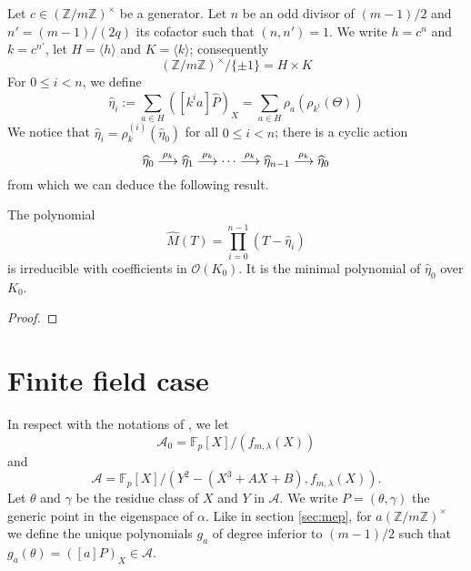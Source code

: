 \documentclass[a4paper]{article} %
\newcommand\zmodninv[1]{(\mathbb{Z}/#1\mathbb{Z})^{\times}}
\newcommand\GF[1]{\mathbb{F}_{#1}}
\newcommand\EO{\mathcal{O}}
\newcommand\groupgen[1]{\langle{#1}\rangle}
\begin{document}
Let $c\in\zmodninv{m}$ be a generator. Let $n$ be an odd divisor of $(m-1)/2$
and $n' = (m-1)/(2q)$ its cofactor such that $(n, n') = 1$.
We write $h = c^n$ and $k = c^{n'}$, let $H = \groupgen{h}$ and $K =
\groupgen{k}$; consequently 
\begin{equation}
\zmodninv{m}/\lbrace{\pm1}\rbrace = H \times K
\end{equation}
For $0 \leq i < n$, we define 
\begin{equation}
\widehat{\eta}_i := \sum_{a\in H}{\left([k^ia]\widehat{P}\right)_X} = \sum_{a\in
H}{\rho_a(\rho_{k^i}(\Theta))}
\end{equation}
We notice that $\widehat{\eta}_i = \rho_k^{(i)}(\widehat{\eta}_0)$ for all $ 0 \leq
i < n$; there is a cyclic action
\begin{equation}
\widehat{\eta}_0 \buildrel\rho_k\over\longrightarrow
\widehat{\eta}_1 \buildrel\rho_k\over\longrightarrow \dots 
\buildrel\rho_k\over\longrightarrow \widehat{\eta}_{n-1}
\buildrel\rho_k\over\longrightarrow \widehat{\eta}_0
\end{equation}
from which we can deduce the following result.
\begin{lem}
The polynomial
\begin{equation}
\widehat{M}(T) = \prod_{i = 0}^{n - 1}{(T - \widehat{\eta}_i)}
\end{equation}
is irreducible with coefficients in $\EO(K_0)$. It is the minimal
polynomial of $\widehat{\eta}_0$ over $K_0$.
\end{lem}
\begin{proof}


\end{proof}

\section{Finite field case}

In respect with the notations of \cite{MiMoSch}, we let
\begin{equation}
\mathcal{A}_0 = \GF{p}[X]/(f_{m,\lambda}(X))
\end{equation}
and
\begin{equation}
\mathcal{A} = \GF{p}[X]/(Y^2 - (X^3 + AX + B), f_{m,\lambda}(X)).
\end{equation}
Let $\theta$ and $\gamma$ be the residue class of $X$ and $Y$ in $\mathcal{A}$.
We write $P = (\theta, \gamma)$ the generic point in the eigenspace of $\alpha$. 
Like in section \ref{sec:mep}, for $a\zmodninv{m}$ we define the unique 
polynomials $g_a$ of degree inferior to $(m-1)/2$ such that $g_a(\theta) = 
([a]P)_X \in\mathcal{A}$.
\end{document}
